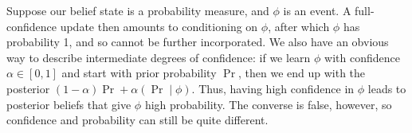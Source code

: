 \begin{example} \label{ex:prob-simple}
Suppose
our belief state is a probability measure, and $\phi$ is an event. 
A full-confidence update then amounts to conditioning on $\phi$, after which $\phi$ has probability 1, and so cannot be further incorporated.
We also have an obvious way to describe intermediate degrees of confidence:
if we learn $\phi$ with confidence
$\alpha \in [0,1]$
and start with prior probability $\Pr$, then we end up with the
posterior $(1-\alpha)\Pr + \alpha (\Pr\mid \phi)$.
%
Thus, having high confidence in $\phi$ leads to posterior beliefs that give $\phi$
high
probability.
The converse is false, however, so
confidence and probability can still be quite different.
% 

\end{example}
